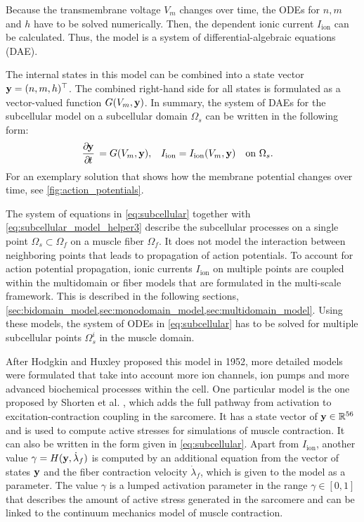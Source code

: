 Because the transmembrane voltage $V_m$ changes over time, the ODEs for $n, m$ and $h$ have to be solved numerically. Then, the dependent ionic current $I_\text{ion}$ can be calculated. Thus, the model is a system of differential-algebraic equations (DAE).

The internal states in this model can be combined into a state vector $\textbf{y} = (n,m,h)^\top$. 
The combined right-hand side for all states is formulated as a vector-valued function $G(V_m,\textbf{y})$.
In summary, the system of DAEs for the subcellular model on a subcellular domain $\Omega_s$ can be written in the following form:
\begin{align}
  \dfrac{\partial\bfy}{\partial t} &= G(V_m,\bfy),& I_\text{ion}&=I_\text{ion}(V_m,\bfy) \quad \text{on }\Omega_s\label{eq:subcellular}.
\end{align}
For an exemplary solution that shows how the membrane potential changes over time, see \cref{fig:action_potentials}. 

The system of equations in \cref{eq:subcellular} together with \cref{eq:subcellular_model_helper3} describe the subcellular processes on a single point $\Omega_s \subset \Omega_f$ on a muscle fiber $\Omega_f$. 
It does not model the interaction between neighboring points that leads to propagation of action potentials.
To account for action potential propagation, ionic currents $I_\text{ion}$ on multiple points are coupled within the multidomain or fiber models that are formulated in the multi-scale framework. This is described in the following sections, \cref{sec:bidomain_model,sec:monodomain_model,sec:multidomain_model}.
Using these models, the system of ODEs in \cref{eq:subcellular} has to be solved for multiple subcellular points $\Omega_s^i$ in the muscle domain.

After Hodgkin and Huxley proposed this model in 1952, more detailed models were formulated that take into account more ion channels, ion pumps and more advanced biochemical processes within the cell. One particular model is the one proposed by Shorten et al. \cite{Shorten2007}, which adds the full pathway from activation to excitation-contraction coupling in the sarcomere. It has a state vector of $\textbf{y} \in \mathbb{R}^{56}$ and is used to compute active stresses for simulations of muscle contraction. 
It can also be written in the form given in \cref{eq:subcellular}.
Apart from $I_\text{ion}$, another value $\gamma = H(\textbf{y},\dot{\lambda}_f)$ is computed by an additional equation from the vector of states $\textbf{y}$ and the fiber contraction velocity $\dot{\lambda}_f$, which is given to the model as a parameter.
The value $\gamma$ is a lumped activation parameter in the range $\gamma \in [0,1]$ that describes the amount of active stress generated in the sarcomere and can be linked to the continuum mechanics model of muscle contraction.

